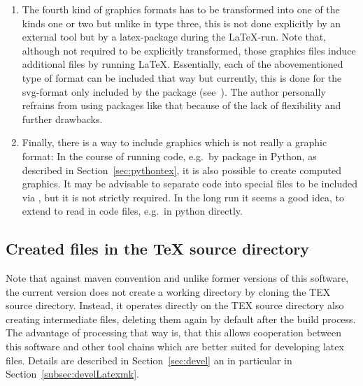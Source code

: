 \begin{enumerate}
\begin{itemize}
  formats,
\item
  likewise, metapost (\gls{mp}-format),
  described in~\cite{MPost24} because it is native to \LaTeX{} 
  and quite versatile 
\end{itemize}
\item\label{it:transImp}
The fourth kind of graphics formats 
has to be transformed into one of the kinds one or two 
but unlike in type three, this is not done explicitly 
by an external tool but by a latex-package during the \LaTeX-run. 
Note that, although not required to be explicitly transformed, 
those graphics files induce additional files 
by running \LaTeX.
Essentially, each of the abovementioned type of format
can be included that way but currently,
this is done for the \gls{svg}-format only
included by the package  (see~\cite{SvgP}).
The author personally refrains from using packages like that
because of the lack of flexibility and further drawbacks. 
\item 
Finally, there is a way to include graphics which is not really a graphic format: 
In the course of running code, e.g.~by package  in Python, 
as described in Section~\ref{sec:pythontex}, 
it is also possible to create computed graphics. 
It may be advisable to separate code into special files to be included via , 
but it is not strictly required. 
In the long run it seems a good idea, to extend  
to read in code files, e.g.~in python directly. 
\end{enumerate}




\subsection{Created files in the \TeX{} source directory}\label{subsec:sourceCreated}

Note that against maven convention and unlike former versions of this software, 
the current version does not create a working directory 
by cloning the TEX source directory. 
Instead, it operates directly on the TEX source directory 
also creating intermediate files, 
deleting them again by default after the build process.
The advantage of processing that way is,
that this allows cooperation between this software
and other tool chains which are better suited for developing latex files.
Details are described in Section~\ref{sec:devel} an in particular in Section~\ref{subsec:develLatexmk}.


